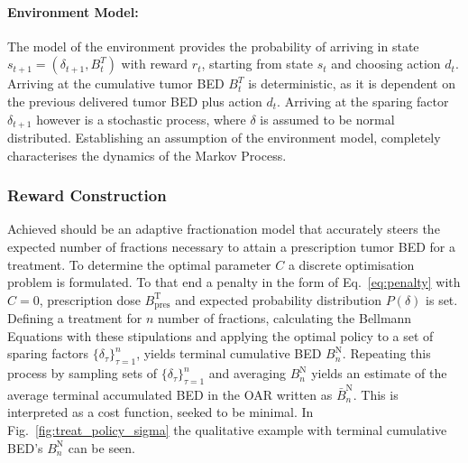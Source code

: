 \documentclass[\relativeRoot/ada.tex]{subfiles}
\begin{document}
\paragraph{Environment Model:} The model of the environment provides the probability of    arriving in state $s_{t+1} = (\delta_{t+1}, B^T_{t})$ with reward $r_t$, starting from state $s_t$ and choosing action $d_t$. Arriving at the cumulative tumor BED $B^T_{t}$ is deterministic, as it is dependent on the previous delivered tumor BED plus action $d_t$. Arriving at the sparing factor $\delta_{t+1}$ however is a stochastic process, where $\delta$ is assumed to be normal distributed. Establishing an assumption of the environment model, completely characterises the dynamics of the Markov Process.

\subsubsection{Reward Construction}
Achieved should be an adaptive fractionation model that accurately steers the expected number of fractions necessary to attain a prescription tumor BED for a treatment. To determine the optimal parameter $C$ a discrete optimisation problem is formulated. To that end a penalty in the form of Eq.~\eqref{eq:penalty} with $C=0$, prescription dose $B_{\text{pres}}^{\text{T}}$ and expected probability distribution $P(\delta)$ is set. Defining a treatment for $n$ number of fractions, calculating the Bellmann Equations with these stipulations and applying the optimal policy to a set of sparing factors $\{\delta_\tau\}_{\tau=1}^{n}$, yields terminal cumulative BED $B^{\text{N}}_n$. Repeating this process by sampling sets of $\{\delta_\tau\}_{\tau=1}^{n}$ and averaging $B^{\text{N}}_n$ yields an estimate of the average terminal accumulated BED in the OAR written as $\bar{B}^{\text{N}}_n$. This is interpreted as a cost function, seeked to be minimal. In Fig.~\ref{fig:treat_policy_sigma} the qualitative example with terminal cumulative BED's $B^{\text{N}}_n$ can be seen.
\end{document}
